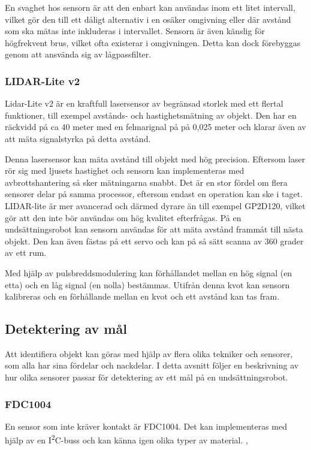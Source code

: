 \documentclass[11pt]{article}
\begin{document}
\begin{flushleft}
En svaghet hos sensorn är att den enbart kan användas inom ett litet intervall, vilket gör den till ett dåligt alternativ i en osäker omgivning eller där avstånd som ska mätas inte inkluderas i intervallet. Sensorn är även känslig för högfrekvent brus, vilket ofta existerar i omgivningen. Detta kan dock förebyggas genom att ansvända sig av lågpassfilter. 

\subsubsection{LIDAR-Lite v2}
Lidar-Lite v2 är en kraftfull lasersensor av begränsad storlek med ett flertal funktioner, till exempel avstånds- och hastighetsmätning av objekt. Den har en räckvidd på ca 40 meter med en felmarignal på på 0,025 meter och klarar även av att mäta signalstyrka på detta avstånd. \cite{Lidar}

Denna lasersensor kan mäta avstånd till objekt med hög precision. Eftersom laser rör sig med ljusets hastighet och sensorn kan implementeras med avbrottshantering så sker mätningarna snabbt. Det är en stor fördel om flera sensorer delar på samma processor, eftersom endast en operation kan ske i taget. LIDAR-lite är mer avancerad och därmed dyrare än till exempel GP2D120, vilket gör att den inte bör användas om hög kvalitet efterfrågas. På en undsättningsrobot kan sensorn användas för att mäta avstånd frammåt till nästa objekt. Den kan även fästas på ett servo och kan på så sätt scanna av 360 grader av ett rum. \cite{Lidar}

Med hjälp av pulsbreddsmodulering kan förhållandet mellan en hög signal (en etta) och en låg signal (en nolla) bestämmas. Utifrån denna kvot kan sensorn kalibreras och en förhållande mellan en kvot och ett avstånd kan tas fram. \cite{Lidar}

\subsection{Detektering av mål}
Att identifiera objekt kan göras med hjälp av flera olika tekniker och sensorer, som alla har sina fördelar och nackdelar. I detta avsnitt följer en beskrivning av hur olika sensorer passar för detektering av ett mål på en undsättningsrobot.


\subsubsection{FDC1004} %
En sensor som inte kräver kontakt är FDC1004. Det kan implementeras med hjälp av en I\textsuperscript{2}C-buss och kan känna igen olika typer av material. \cite{Texas}, \cite{Texas2}


\end{flushleft}
\end{document}
